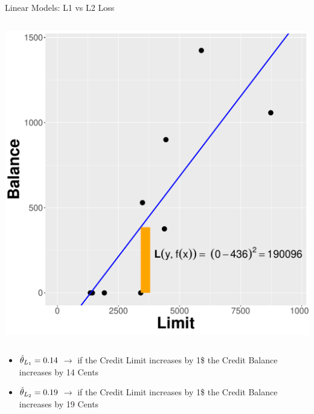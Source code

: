 \documentclass[11pt,compress,t,notes=noshow, xcolor=table]{beamer}
\begin{document}
\begin{vbframe}{Linear Models: L1 vs L2 Loss}
\begin{columns}
\begin{column}{0.5\textwidth}
\begin{center}
  \includegraphics[width = \textwidth]{figure/nutshell-regression-L2-regr-line.pdf}
\end{center}
\end{column}
\end{columns}
\begin{minipage}[t]{0.5\textwidth}
    \footnotesize
    \begin{itemize}
        \item \small $\hat{\theta}_{L_1} = 0.14$ $\rightarrow$ if the Credit Limit increases by 1\$ the Credit Balance increases by 14 Cents 
    \end{itemize}
\end{minipage}
\hfill
\begin{minipage}[t]{0.48\textwidth}
    \footnotesize
    \begin{itemize}
        \item \small $\hat{\theta}_{L_2} = 0.19$ $\rightarrow$ if the Credit Limit increases by 1\$ the Credit Balance increases by 19 Cents
    \end{itemize}
\end{minipage}


\end{vbframe}
\end{document}
